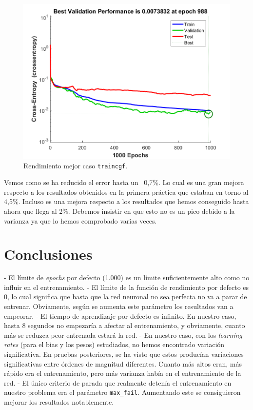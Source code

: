 \documentclass[a4paper,12pt,titlepage]{article}
\begin{document}
\begin{figure}[!ht]
	\centering
	\label{fig:traincgb}
	\includegraphics[width=\textwidth]{traincgf560000405.png}
	\caption{Rendimiento mejor caso \lstinline|traincgf|.}
\end{figure}

Vemos como se ha reducido el error hasta un ~0,7\%. Lo cual es una gran mejora respecto a los resultados obtenidos en la primera práctica que estaban en torno al 4,5\%. Incluso es una mejora respecto a los resultados que hemos conseguido hasta ahora que llega al 2\%. Debemos insistir en que esto no es un pico debido a la varianza ya que lo hemos comprobado varias veces.

\section{Conclusiones}

- El límite de \textit{epochs} por defecto (1.000) es un límite suficientemente alto como no influir en el entrenamiento.
- El límite de la función de rendimiento por defecto es 0, lo cual significa que hasta que la red neuronal no sea perfecta no va a parar de entrenar. Obviamente, según se aumenta este parámetro los resultados van a empeorar.
- El tiempo de aprendizaje por defecto es infinito. En nuestro caso, hasta 8 segundos no empezaría a afectar al entrenamiento, y obviamente, cuanto más se reduzca peor entrenada estará la red.
- En nuestro caso, con los \textit{learning rates} (para el bias y los pesos) estudiados, no hemos encontrado variación significativa. En pruebas posteriores, se ha visto que estos producían variaciones significativas entre órdenes de magnitud diferentes. Cuanto más altos eran, más rápido era el entrenamiento, pero más varianza había en el entrenamiento de la red.
- El único criterio de parada que realmente detenía el entrenamiento en nuestro problema era el parámetro \lstinline|max_fail|. Aumentando este se consiguieron mejorar los resultados notablemente.



\end{document}
